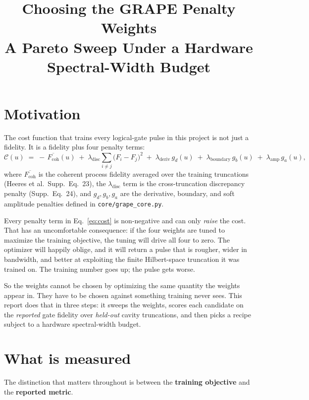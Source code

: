 \documentclass[11pt]{article}
\title{Choosing the GRAPE Penalty Weights\\
\large A Pareto Sweep Under a Hardware Spectral-Width Budget}
\author{}
\date{}
\newcommand{\lamd}{\lambda_{\mathrm{deriv}}}
\newcommand{\lamb}{\lambda_{\mathrm{boundary}}}
\newcommand{\lama}{\lambda_{\mathrm{amp}}}
\newcommand{\lamdisc}{\lambda_{\mathrm{disc}}}
\begin{document}
\sloppy
\maketitle

\section{Motivation}
\label{sec:motivation}

The cost function that trains every logical-gate pulse in this project is not just a fidelity.
It is a fidelity plus four penalty terms:
%
\begin{equation}
\label{eq:cost}
\mathcal{C}(u) \;=\; -\,\overline{F_{\mathrm{coh}}}(u)
\;+\; \lamdisc \sum_{i \neq j} \bigl(F_i - F_j\bigr)^2
\;+\; \lamd\, g_{d}(u)
\;+\; \lamb\, g_{b}(u)
\;+\; \lama\, g_{a}(u),
\end{equation}
%
where $\overline{F_{\mathrm{coh}}}$ is the coherent process fidelity averaged over the training
truncations (Heeres et al.\ Supp.\ Eq.~23), the $\lamdisc$ term is the cross-truncation
discrepancy penalty (Supp.\ Eq.~24), and $g_d, g_b, g_a$ are the derivative, boundary, and soft
amplitude penalties defined in \texttt{core/grape\_core.py}.

Every penalty term in Eq.~\eqref{eq:cost} is non-negative and can only \emph{raise} the cost.
That has an uncomfortable consequence: if the four weights are tuned to maximize the training
objective, the tuning will drive all four to zero. The optimizer will happily oblige, and it will
return a pulse that is rougher, wider in bandwidth, and better at exploiting the finite
Hilbert-space truncation it was trained on. The training number goes up; the pulse gets worse.

So the weights cannot be chosen by optimizing the same quantity the weights appear in. They have
to be chosen against something training never sees. This report does that in three steps: it
sweeps the weights, scores each candidate on the \emph{reported} gate fidelity over
\emph{held-out} cavity truncations, and then picks a recipe subject to a hardware spectral-width
budget.

\section{What is measured}
\label{sec:metrics}

The distinction that matters throughout is between the \textbf{training objective} and the
\textbf{reported metric}.
\end{document}
